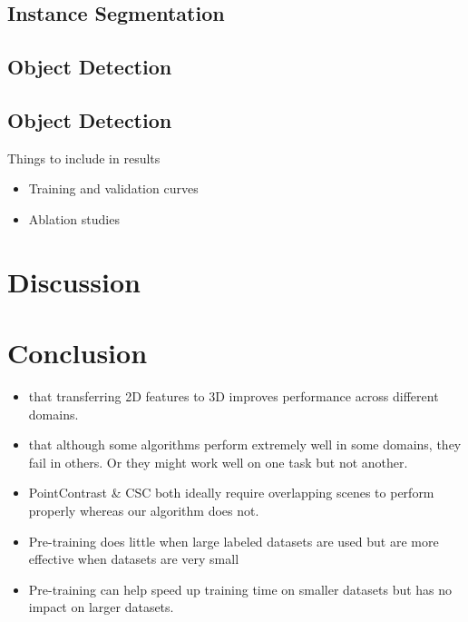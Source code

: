 \documentclass[10pt,twocolumn,letterpaper]{article}
\begin{document}
\subsection{Instance Segmentation}
\label{sec:results:instance}

\subsection{Object Detection}
\label{sec:results:object}

\subsection{Object Detection}
\label{sec:results:object}

Things to include in results
\begin{itemize}
    \item Training and validation curves
    \item Ablation studies
\end{itemize}

\section{Discussion}

\section{Conclusion}
\label{sec:conclusion}

\begin{itemize}
    \item that transferring 2D features to 3D improves performance across different domains.
    \item that although some algorithms perform extremely well in some domains, they fail in others. Or they might work well on one task but not another.
    \item PointContrast \& CSC both ideally require overlapping scenes to perform properly whereas our algorithm does not.
    \item Pre-training does little when large labeled datasets are used but are more effective when datasets are very small
    \item Pre-training can help speed up training time on smaller datasets but has no impact on larger datasets.
\end{itemize}


\clearpage
{\small
    
    
}
\end{document}
